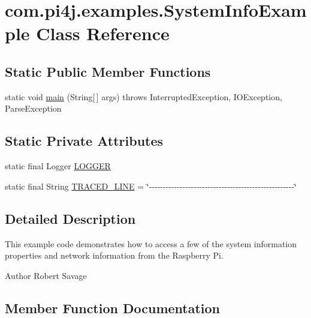 \hypertarget{classcom_1_1pi4j_1_1examples_1_1SystemInfoExample}{}\section{com.\+pi4j.\+examples.\+System\+Info\+Example Class Reference}
\label{classcom_1_1pi4j_1_1examples_1_1SystemInfoExample}
\subsection*{Static Public Member Functions}
\begin{DoxyCompactItemize}
\item 
static void \hyperlink{classcom_1_1pi4j_1_1examples_1_1SystemInfoExample_ae080b767ecc6c2e52b8567642a835a21}{main} (String\mbox{[}$\,$\mbox{]} args)  throws Interrupted\+Exception,             I\+O\+Exception, Parse\+Exception 
\end{DoxyCompactItemize}
\subsection*{Static Private Attributes}
\begin{DoxyCompactItemize}
\item 
static final Logger \hyperlink{classcom_1_1pi4j_1_1examples_1_1SystemInfoExample_ae8139fbdf213b0a34f5809c18d2d1693}{L\+O\+G\+G\+E\+R}
\item 
static final String \hyperlink{classcom_1_1pi4j_1_1examples_1_1SystemInfoExample_a81a12af5bdd93c15ca58b21a02a6d2ac}{T\+R\+A\+C\+E\+D\+\_\+\+L\+I\+N\+E} = \char`\"{}-\/-\/-\/-\/-\/-\/-\/-\/-\/-\/-\/-\/-\/-\/-\/-\/-\/-\/-\/-\/-\/-\/-\/-\/-\/-\/-\/-\/-\/-\/-\/-\/-\/-\/-\/-\/-\/-\/-\/-\/-\/-\/-\/-\/-\/-\/-\/-\/-\/-\/-\/-\/\char`\"{}
\end{DoxyCompactItemize}


\subsection{Detailed Description}
This example code demonstrates how to access a few of the system information properties and network information from the Raspberry Pi.

\begin{DoxyAuthor}{Author}
Robert Savage 
\end{DoxyAuthor}


\subsection{Member Function Documentation}
\hypertarget{classcom_1_1pi4j_1_1examples_1_1SystemInfoExample_ae080b767ecc6c2e52b8567642a835a21}{}
